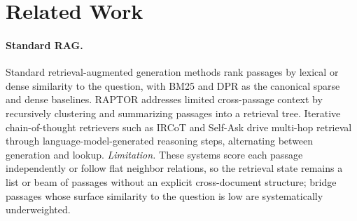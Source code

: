 %
%

\section{Related Work}
\label{sec:related}

\paragraph{Standard RAG.}
Standard retrieval-augmented generation methods rank passages by
lexical or dense similarity to the question, with BM25
\citep{robertson2009bm25} and DPR \citep{karpukhin2020dpr} as the
canonical sparse and dense baselines. RAPTOR
\citep{sarthi2024raptor} addresses limited cross-passage context by
recursively clustering and summarizing passages into a retrieval
tree. Iterative chain-of-thought retrievers such as IRCoT
\citep{trivedi2023ircot} and Self-Ask \citep{press2023selfask}
drive multi-hop retrieval through language-model-generated reasoning
steps, alternating between generation and lookup. \emph{Limitation.}
These systems score each passage independently or follow flat
neighbor relations, so the retrieval state remains a list or beam
of passages without an explicit cross-document structure; bridge
passages whose surface similarity to the question is low are
systematically underweighted.

